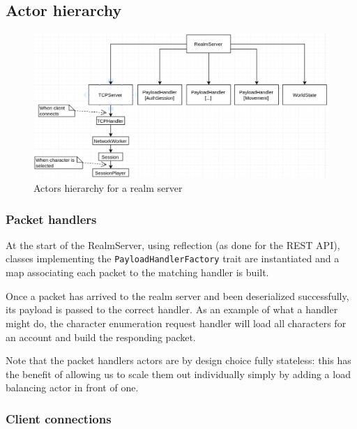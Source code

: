\documentclass[paper=a4, fontsize=11pt]{scrartcl}
\begin{document}

\subsection{Actor hierarchy}

\begin{figure}[htb!]
    \centering
    \includegraphics[width=\textwidth]{realmactors}
    \caption{Actors hierarchy for a realm server}
\end{figure}

\subsubsection{Packet handlers}

At the start of the RealmServer, using reflection (as done for the REST API),
classes implementing the \texttt{PayloadHandlerFactory} trait are instantiated
and a map associating each packet to the matching handler is built.

Once a packet has arrived to the realm server and been deserialized
successfully, its payload is passed to the correct handler.
As an example of what a handler might do, the character enumeration request
handler will load all characters for an account and build the responding packet.

Note that the packet handlers actors are by design choice fully stateless: this
has the benefit of allowing us to scale them out individually simply by adding a
load balancing actor in front of one.

\subsubsection{Client connections}
\end{document}
